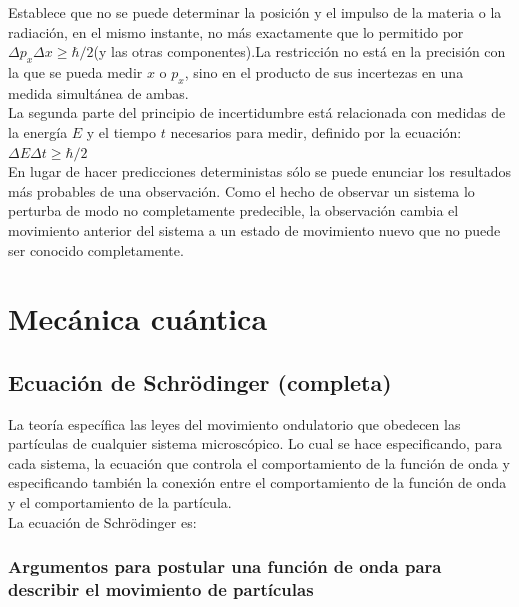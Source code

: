 \documentclass[oneside]{book}
\numberwithin{equation}{section}
\numberwithin{figure}{section}
\numberwithin{table}{section}
\begin{document}
			Establece que no se puede determinar la posición y el impulso de la materia o la radiación, en el mismo instante, no más exactamente que lo permitido por $\Delta p_x \Delta x \geq \hbar/2$(y las otras componentes).La restricción no está en la precisión con la que se pueda medir $x$ o $p_x$, sino en el producto de sus incertezas en una medida simultánea de ambas.\\
			
			La segunda	parte del principio de incertidumbre está relacionada con medidas de la energía $E$ y el tiempo $t$ necesarios para medir, definido por la ecuación: $\Delta E \Delta t \geq \hbar/2$\\
			
			En lugar de hacer predicciones deterministas sólo se puede enunciar los resultados más probables de una observación. Como el hecho de observar un sistema lo perturba de modo no completamente predecible, la observación cambia el movimiento anterior del sistema a un estado de movimiento nuevo que no puede ser conocido completamente.
			
\nopagebreak
	\chapter{Mecánica cuántica}
		\section{Ecuación de Schrödinger (completa)}	
		
			La teoría específica las leyes del movimiento ondulatorio que obedecen las partículas de cualquier sistema microscópico. Lo cual se hace especificando, para cada sistema, la ecuación que controla el comportamiento de la función de onda y especificando también la conexión entre el comportamiento de la función de onda y el comportamiento de la partícula.\\
			
			La ecuación de Schrödinger es: 
			
			\subsection{Argumentos para postular una función de onda para describir el movimiento de partículas}
			
\end{document}
